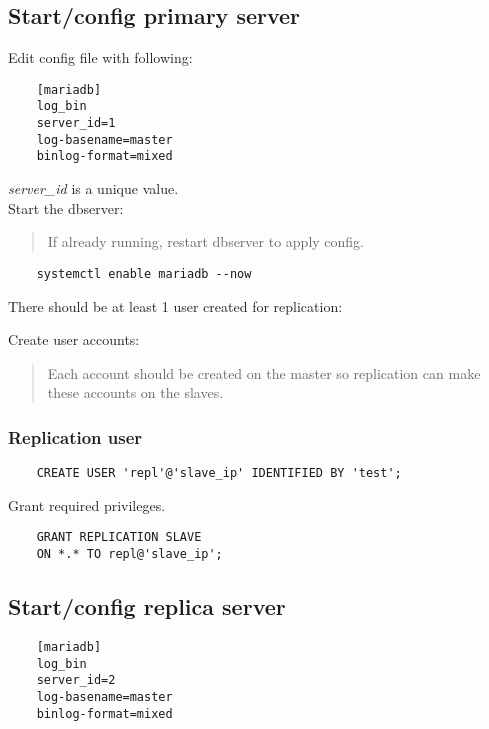 \subsection{Start/config primary server}

Edit config file with following:

\begin{lstlisting}
    [mariadb]
    log_bin
    server_id=1
    log-basename=master
    binlog-format=mixed
\end{lstlisting}

\textit{server\_id} is a unique value.\\
Start the dbserver:

\begin{quote}
    If already running, restart dbserver to apply config.
\end{quote}

\begin{lstlisting}
    systemctl enable mariadb --now
\end{lstlisting}

There should be at least 1 user created for replication:

Create user accounts:

\begin{quote}
    Each account should be created on the master so replication can make these accounts on the slaves.
\end{quote}

\subsubsection{Replication user}

\begin{lstlisting}
    CREATE USER 'repl'@'slave_ip' IDENTIFIED BY 'test';
\end{lstlisting}

Grant required privileges.

\begin{lstlisting}
    GRANT REPLICATION SLAVE
    ON *.* TO repl@'slave_ip';
\end{lstlisting}

\subsection{Start/config replica server}

\begin{lstlisting}
    [mariadb]
    log_bin
    server_id=2
    log-basename=master
    binlog-format=mixed
\end{lstlisting}

